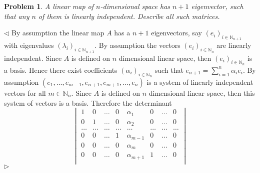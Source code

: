 \documentclass[12pt]{article}
\newtheorem{problem}{Problem}[subsection]
\newenvironment{solution}{\par $\triangleleft$}{$\triangleright$}
\begin{document}
\begin{problem} A linear map of $n$-dimensional space has $n+1$ eigenvector,
such that any $n$ of them is linearly independent. Describe all such matrices.
\end{problem}
\begin{solution} By assumption the linear map $A$ has a $n+1$ eigenvectors, say
    ${(e_i)}_{i\in\mathbb{N}_{n+1}}$ with eigenvalues
    ${(\lambda_i)}_{i\in\mathbb{N}_{n+1}}$. By assumption the vectors
    ${(e_i)}_{i\in\mathbb{N}_n}$ are linearly independent. Since $A$ is defined
    on $n$ dimensional linear space, then ${(e_i)}_{i\in\mathbb{N}_n}$ is a
    basis. Hence there exist coefficients ${(\alpha_i)}_{i\in\mathbb{N}_n}$ such
    that $e_{n+1}=\sum_{i=1}^n \alpha_i e_i$. By assumption
    $(e_1,\ldots,e_{m-1},e_{n+1},e_{m+1},\ldots,e_n)$ is a system of linearly
    independent vectors for all $m\in\mathbb{N}_n$. Since $A$ is defined on $n$
    dimensional linear space, then this system of vectors is a basis. Therefore
    the determinant
    $$
        \begin{vmatrix}
            1            &
            0            &
            \ldots       &
            0            &
            \alpha_1     &
            0            &
            \ldots       & 0 \\
            0            &
            1            &
            \ldots       &
            0            &
            \alpha_2     &
            0            &
            \ldots       &
            0                \\
            \ldots       &
            \ldots       &
            \ldots       &
            \ldots       &
            \ldots       &
            \ldots       &
            \ldots       &
            \ldots           \\
            0            &
            0            &
            \ldots       &
            1            &
            \alpha_{m-1} &
            0            &
            \ldots       &
            0                \\
            0            &
            0            &
            \ldots       &
            0            &
            \alpha_{m}   &
            0            &
            \ldots       &
            0                \\
            0            &
            0            &
            \ldots       &
            0            &
            \alpha_{m+1} &
            1            &
            \ldots       &
            0                \\

\end{vmatrix}$$
\end{solution}
\end{document}
